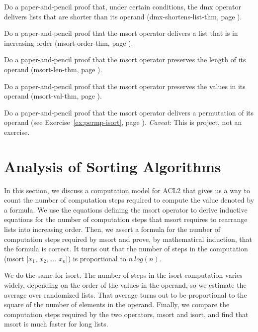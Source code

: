 \begin{ExerciseList}
\Exercise
Do a paper-and-pencil proof that, under certain conditions, the \textsf{dmx} operator
delivers lists that are shorter than its operand
(\textsf{dmx-shortens-list-thm}, page \pageref{defthm:dmx-shortens-list}).

\Exercise
Do a paper-and-pencil proof that the \textsf{msort} operator
delivers a list that is in increasing order
(\textsf{msort-order-thm}, page \pageref{defthm:msort-ord}).

\Exercise
Do a paper-and-pencil proof that the \textsf{msort} operator
preserves the length of its operand
(\textsf{msort-len-thm}, page \pageref{defthm:msort-len}).

\Exercise
\label{msort-val-thm-pencil}
Do a paper-and-pencil proof that the \textsf{msort} operator
preserves the values in its operand
(\textsf{msort-val-thm}, page \pageref{defthm:msort-val}).

\Exercise
Do a paper-and-pencil proof that the \textsf{msort} operator
delivers a permutation of its operand (see Exercise~\ref{ex:permp-isort}, page \pageref{ex:permp-isort}).
\emph{Caveat}: This is project, not an exercise.
\end{ExerciseList}

\section{Analysis of Sorting Algorithms}
\label{sec:sort-analysis}

In
this section, we discuss a
computation model for ACL2
that gives us a way to count the number of computation steps required
to compute the value denoted by a formula.
We use the equations defining
the \textsf{msort} operator to derive inductive equations
for the number of computation steps that \textsf{msort} requires to rearrange lists
into increasing order.
Then, we assert a formula for the number of computation steps required
by \textsf{msort} and prove, by mathematical induction,
that the formula is correct.
It turns out that the number of steps in the computation
\textsf{(msort [$x_1$, $x_2$, $\dots$ $x_n$])}
is proportional to $n~log(n)$.

We do the same for \textsf{isort}.
The number of steps in the \textsf{isort} computation varies widely,
depending on the order of the values in the operand,
so we estimate the average over randomized lists.
That average turns out to be proportional
to the square of the number of elements in the operand.
Finally, we compare the computation steps required by
the two operators, \textsf{msort} and \textsf{isort}, and find that
\textsf{msort} is much faster for long lists.


